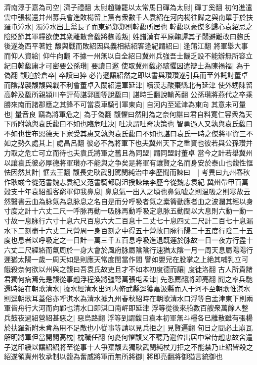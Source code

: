 濟南淳于嘉為司空|{
	濟子禮翻}
太尉趙謙罷以太常馬日磾為太尉|{
	磾丁奚翻}
初何進遣雲中張楊還并州募兵會進敗楊留上黨有衆數千人袁紹在河内楊往歸之與南單于於扶羅屯漳水|{
	濁漳水出上黨長子而東過鄴鄴則韓馥所居也}
韓馥以豪傑多歸心袁紹忌之陰貶節其軍糧欲使其衆離散會馥將麴義叛|{
	姓譜漢有平原鞠譚其子閟避難改曰麴氏後遂為西平著姓}
馥與戰而敗紹因與義相結紹客逢紀謂紹曰|{
	逢蒲江翻}
將軍舉大事而仰人資給|{
	仰牛向翻}
不據一州無以自全紹曰冀州兵強吾士饑乏設不能辦無所容立紀曰韓馥庸才可密要公孫瓚|{
	要讀曰邀}
使取冀州馥必駭懼因遣辯士為陳禍福|{
	為于偽翻}
馥迫於倉卒|{
	卒讀曰猝}
必肯遜讓紹然之即以書與瓚瓚遂引兵而至外託討董卓而陰謀襲馥馥與戰不利會董卓入關紹還軍延津|{
	續漢志酸棗縣北有延津}
使外甥陳留高幹及馥所親潁川辛評荀諶郭圖等說馥曰|{
	諶時壬翻說輸芮翻}
公孫瓚將燕代之卒乘勝來南而諸郡應之其鋒不可當袁車騎引軍東向|{
	自河内至延津為東向}
其意未可量也|{
	量音良}
竊為將軍危之|{
	為于偽翻}
馥懼曰然則為之奈何諶曰君自料寛仁容衆為天下所附孰與袁氏馥曰不如也臨危吐决|{
	吐决謂吐奇决策也}
智勇過人又孰與袁氏馥曰不如也世布恩德天下家受其惠又孰與袁氏馥曰不如也諶曰袁氏一時之傑將軍資三不如之勢久處其上|{
	處昌呂翻}
彼必不為將軍下也夫冀州天下之重資也彼若與公孫瓚并力取之危亡可立而待也夫袁氏將軍之舊且為同盟|{
	謂同盟討董卓}
當今之計若舉冀州以讓袁氏彼必厚德將軍瓚亦不能與之争矣是將軍有讓賢之名而身安於泰山也馥性恇怯因然其計|{
	恇去王翻}
馥長史耿武别駕閔純治中李歷聞而諫曰　|{
	考異曰九州春秋作耿彧今從范書魏志袁紀又范書騎都尉沮授諫無李歷今從魏志袁紀}
冀州帶甲百萬穀支十年袁紹孤客窮軍仰我鼻息|{
	鼻息氣一出入之頃也鼻氣嘘之則温吸之則寒故云然醫書云血為脉氣為息脉息之名自是而分呼吸者氣之槖籥動應者血之波瀾其經以身寸度之計十六丈二尺一呼脉再動一吸脉再動呼吸定息脉五動閏以大息則六動一動一寸故一息脉行六寸十息六尺百息六大二百息十二丈七十息四丈二尺計二百七十息漏水下二刻盡十六丈二尺營周一身百刻之中得五十營故曰脉行陽二十五度行陰二十五度也息者以呼吸定之一日計一萬三千五百息呼吸進退既遲於脉故一日一夜方行盡十六丈二尺經絡而氣周於一身大會於風府脉屬陰陰行速猶太陰一月一周天息屬陽陽行遲猶太陽一歲一周天如是則應天常度閏當作間}
譬如嬰兒在股掌之上絶其哺乳立可餓殺奈何欲以州與之馥曰吾袁氏故吏且才不如本初度德而讓|{
	度徒洛翻}
古人所貴諸君獨何病焉先是馥從事趙浮程渙將彊弩萬張屯孟津|{
	先悉薦翻將即亮翻}
聞之率兵馳還時紹在朝歌清水|{
	據水經清水出河内脩武縣逕獲嘉汲縣而入于河不至朝歌惟淇水則逕朝歌耳蓋俗亦呼淇水為清水據九州春秋紹時在朝歌清水口浮等自孟津東下則兩軍皆舟行大河而向鄴也清水口即淇口南㟁即延津}
浮等從後來船數百艘衆萬餘人整兵鼓夜過紹營紹甚惡之|{
	惡烏路翻}
浮等到謂馥曰袁本初軍無斗糧各已離散雖有張楊於扶羅新附未肯為用不足敵也小從事等請以見兵拒之|{
	見賢遍翻}
旬日之間必土崩瓦解明將軍但當開閣高枕|{
	枕職任翻}
何憂何懼馥又不聽乃避位出居中常侍趙忠故舍遣子送印綬以讓紹紹將至從事十人爭棄馥去獨耿武閔純杖刀拒之不能禁乃止紹皆殺之紹遂領冀州牧承制以馥為奮威將軍而無所將御|{
	將即亮翻將御猶言統御也}

